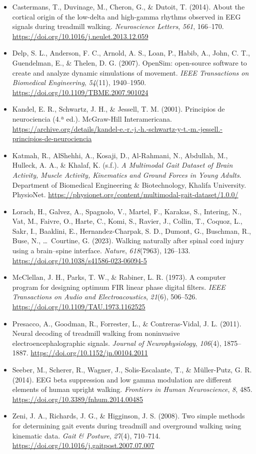 \documentclass[10pt]{article}
\begin{document}
{\sloppy
\begin{itemize}
    \item Castermans, T., Duvinage, M., Cheron, G., \& Dutoit, T. (2014). About the cortical origin of the low-delta and high-gamma rhythms observed in EEG signals during treadmill walking. \textit{Neuroscience Letters}, \textit{561}, 166--170. \url{https://doi.org/10.1016/j.neulet.2013.12.059}
    \item Delp, S. L., Anderson, F. C., Arnold, A. S., Loan, P., Habib, A., John, C. T., Guendelman, E., \& Thelen, D. G. (2007). OpenSim: open-source software to create and analyze dynamic simulations of movement. \textit{IEEE Transactions on Biomedical Engineering}, \textit{54}(11), 1940--1950. \url{https://doi.org/10.1109/TBME.2007.901024}
    \item Kandel, E. R., Schwartz, J. H., \& Jessell, T. M. (2001). Principios de neurociencia (4.ª ed.). McGraw-Hill Interamericana. \url{https://archive.org/details/kandel-e.-r.-j.-h.-schwartz-y-t.-m.-jessell.-principios-de-neurociencia}
    \item Katmah, R., AlShehhi, A., Kosaji, D., Al-Rahmani, N., Abdullah, M., Hulleck, A. A., \& Khalaf, K. (s.f.). \textit{A Multimodal Gait Dataset of Brain Activity, Muscle Activity, Kinematics and Ground Forces in Young Adults}. Department of Biomedical Engineering \& Biotechnology, Khalifa University. PhysioNet. \url{https://physionet.org/content/multimodal-gait-dataset/1.0.0/}
    \item Lorach, H., Galvez, A., Spagnolo, V., Martel, F., Karakas, S., Intering, N., Vat, M., Faivre, O., Harte, C., Komi, S., Ravier, J., Collin, T., Coquoz, L., Sakr, I., Baaklini, E., Hernandez-Charpak, S. D., Dumont, G., Buschman, R., Buse, N., \dots\ Courtine, G. (2023). Walking naturally after spinal cord injury using a brain--spine interface. \textit{Nature}, \textit{618}(7963), 126--133. \url{https://doi.org/10.1038/s41586-023-06094-5}
    \item McClellan, J. H., Parks, T. W., \& Rabiner, L. R. (1973). A computer program for designing optimum FIR linear phase digital filters. \textit{IEEE Transactions on Audio and Electroacoustics}, \textit{21}(6), 506--526. \url{https://doi.org/10.1109/TAU.1973.1162525}
    \item Presacco, A., Goodman, R., Forrester, L., \& Contreras-Vidal, J. L. (2011). Neural decoding of treadmill walking from noninvasive electroencephalographic signals. \textit{Journal of Neurophysiology}, \textit{106}(4), 1875--1887. \url{https://doi.org/10.1152/jn.00104.2011}
    \item Seeber, M., Scherer, R., Wagner, J., Solis-Escalante, T., \& Müller-Putz, G. R. (2014). EEG beta suppression and low gamma modulation are different elements of human upright walking. \textit{Frontiers in Human Neuroscience}, \textit{8}, 485. \url{https://doi.org/10.3389/fnhum.2014.00485}
    \item Zeni, J. A., Richards, J. G., \& Higginson, J. S. (2008). Two simple methods for determining gait events during treadmill and overground walking using kinematic data. \textit{Gait \& Posture}, \textit{27}(4), 710--714. \url{https://doi.org/10.1016/j.gaitpost.2007.07.007}
\end{itemize}
}
\end{document}
